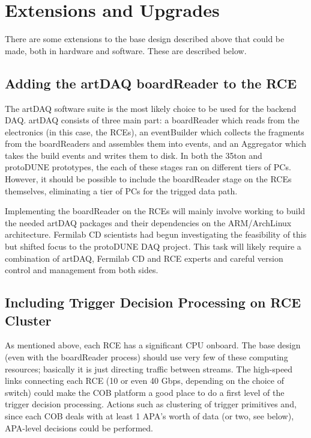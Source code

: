 




\section{Extensions and Upgrades}
\label{sec:upgrades}

There are some extensions to the base design described above that could be made, both in hardware and software.  These are described below. 

\subsection{Adding the artDAQ boardReader to the RCE}
\label{sec:board reader}
The artDAQ software suite is the most likely choice to be used for the backend DAQ.  artDAQ consists of three main part:  a boardReader which reads from the electronics (in this case, the RCEs), an eventBuilder which collects the fragments from the boardReaders and assembles them into events, and an Aggregator which takes the build events and writes them to disk.  In both the 35ton and protoDUNE prototypes, the each of these stages ran on different tiers of PCs.  However, it should be possible to include the boardReader stage on the RCEs themselves, eliminating a tier of PCs for the trigged data path. 

Implementing the boardReader on the RCEs will mainly involve working to build the needed artDAQ packages and their dependencies on the ARM/ArchLinux architecture.  Fermilab CD scientists had begun investigating the feasibility of this but shifted focus to the protoDUNE DAQ project.  This task will likely require a combination of artDAQ, Fermilab CD and  RCE experts and careful version control and management from both sides.  

\subsection{Including Trigger Decision Processing on RCE Cluster}
\label{sec:triggerOnRCE}
 As mentioned above,  each RCE has a significant CPU onboard. The base design (even with the boardReader process) should use very few of these computing resources; basically it is just directing traffic between streams.  The high-speed links connecting each RCE (10 or even 40 Gbps, depending on the choice of switch) could make the COB platform a good place to do a first level of the trigger decision processing.  Actions such as clustering of trigger primitives and, since  each COB deals with at least 1 APA's worth of data (or two, see below), APA-level decisions could be performed.  
 
